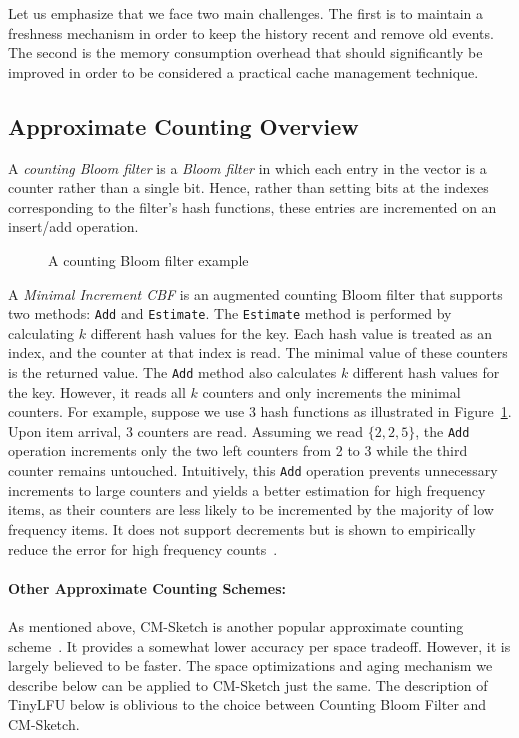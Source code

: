 \documentclass[10pt,a4paper]{article}
\begin{document}
Let us emphasize that we face two main challenges.
The first is to maintain a freshness mechanism in order to keep the history recent and remove old events.
The second is the memory consumption overhead that should significantly be improved in order to be considered a practical cache management technique.


\subsection{Approximate Counting Overview}


A \emph{counting Bloom filter} is a \emph{Bloom filter} in which each entry in the vector is a counter rather than a single bit.
Hence, rather than setting bits at the indexes corresponding to the filter's hash functions, these entries are incremented on an insert/add operation.

\begin{figure}[t]
\caption{A counting Bloom filter example}
\label{fig:MICBF}
\end{figure}

A \emph{Minimal Increment CBF} is an augmented counting Bloom filter that supports two methods: \texttt{Add} and \texttt{Estimate}.
The \texttt{Estimate} method is performed by calculating $k$ different hash values for the key.
Each hash value is treated as an index, and the counter at that index is read.
The minimal value of these counters is the returned value.
The \texttt{Add} method also calculates $k$ different hash values for the key.
However, it reads all $k$ counters and only increments the minimal counters.
For example, suppose we use 3 hash functions as illustrated in Figure~\ref{fig:MICBF}.
Upon item arrival, 3 counters are read.
Assuming we read $\{2,2,5\}$, the \texttt{Add} operation increments only the two left counters from 2 to 3 while the third counter remains untouched.
Intuitively, this \texttt{Add} operation prevents unnecessary increments to large counters and yields a better estimation for high frequency items, as their counters are less likely to be incremented by the majority of low frequency items.
It does not support decrements but is shown to empirically reduce the error for high frequency counts~\cite{SpectralBloom}.

\paragraph*{Other Approximate Counting Schemes:}
As mentioned above, CM-Sketch is another popular approximate counting scheme~\cite{CountMinSketch}.
It provides a somewhat lower accuracy per space tradeoff.
However, it is largely believed to be faster.
The space optimizations and aging mechanism we describe below can be applied to CM-Sketch just the same.
The description of TinyLFU below is oblivious to the choice between Counting Bloom Filter and CM-Sketch.
\end{document}
